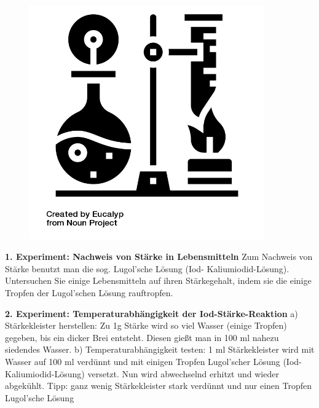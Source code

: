 \documentclass{scrartcl}  %
\begin{document}
			\begin{tcolorbox}[enhanced,
				colback=white,
				colframe=green!30!black,
				fonttitle=\sffamily\bfseries\large, 
				title=Durchführung,  %
				attach boxed title to top left={xshift=3.2mm,yshift=-0.50mm},
				boxed title style={skin=enhancedfirst jigsaw,size=small,arc=1mm,bottom=-1mm,colframe=green!50!black,height=0.75cm},
				colbacktitle=green!50!black,
				drop lifted shadow]
				\begin{figure}  
					\centering
					\vspace{-14pt}  %
					\includegraphics[width=0.9\textwidth]{symbols/symbol_tex_method}
				\end{figure}
				
				\textbf{1. Experiment: Nachweis von Stärke in Lebensmitteln} \newline
				Zum Nachweis von Stärke benutzt man die sog. Lugol’sche Lösung (Iod- Kaliumiodid-Lösung). Untersuchen Sie einige Lebensmitteln auf ihren Stärkegehalt, indem sie die einige Tropfen der Lugol’schen Lösung rauftropfen. 
				
				\textbf{2. Experiment: Temperaturabhängigkeit der Iod-Stärke-Reaktion} \newline
				a) Stärkekleister herstellen: Zu 1g Stärke wird so viel Wasser (einige Tropfen) gegeben, bis ein dicker Brei entsteht. Diesen gießt man in 100 ml nahezu siedendes Wasser. \newline
				b) Temperaturabhängigkeit testen: 1 ml Stärkekleister wird mit Wasser auf 100 ml verdünnt und mit einigen Tropfen Lugol’scher Lösung (Iod-Kaliumiodid-Lösung) versetzt. Nun wird abwechselnd erhitzt und wieder abgekühlt. \newline
				Tipp: ganz wenig Stärkekleister stark verdünnt und nur einen Tropfen Lugol’sche Lösung  
				

\end{tcolorbox}
\end{document}
